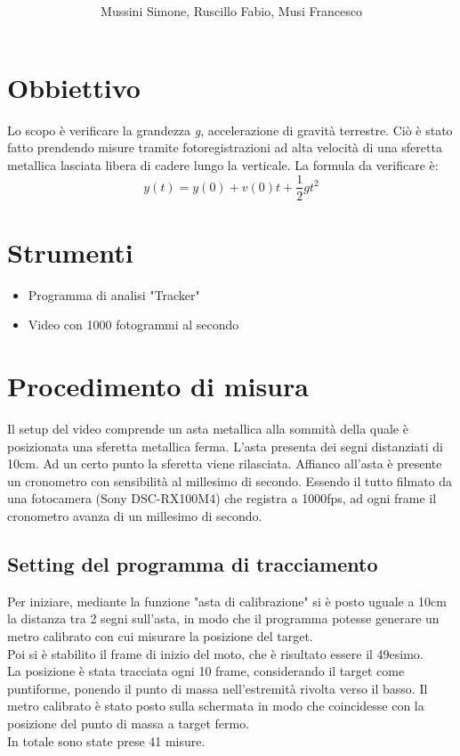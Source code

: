 \documentclass[12pt, a4paper]{article}
\title{\textbf{\scalebox{1.3}{\text{Moto di un grave lungo la verticale}}}}
\date{}
\author{\begin{small}Mussini Simone, Ruscillo Fabio, Musi Francesco\end{small}}
\begin{document}
\maketitle
\section{Obbiettivo}
Lo scopo è verificare la grandezza \textit{g}, accelerazione di gravità terrestre. 
Ciò è stato fatto prendendo misure tramite fotoregistrazioni ad alta velocità di una sferetta metallica lasciata libera di cadere lungo la verticale. 
La formula da verificare è:
\begin{equation*}
    y(t) = y(0) + v(0)t + \frac{1}{2}gt^2
\end{equation*}


\section{Strumenti}
\begin{itemize}
\setlength\itemsep{0mm}
    \item Programma di analisi "Tracker"
    \item Video con 1000 fotogrammi al secondo
\end{itemize}

\section{Procedimento di misura}
Il setup del video comprende un asta metallica alla sommità della quale è posizionata una sferetta metallica ferma. L'asta presenta dei segni distanziati di 10cm. 
Ad un certo punto la sferetta viene rilasciata. Affianco all'asta è presente un cronometro con sensibilità al millesimo di secondo. 
Essendo il tutto filmato da una fotocamera (Sony DSC-RX100M4) che registra a 1000fps, ad ogni frame il cronometro avanza di un millesimo di secondo.

  
\subsection{Setting del programma di tracciamento}
Per iniziare, mediante la funzione "asta di calibrazione" si è posto uguale a 10cm la distanza tra 2 segni sull'asta, in modo che il programma potesse generare un metro calibrato con cui misurare la posizione del target. \\
Poi si è stabilito il frame di inizio del moto, che è risultato essere il 49esimo.  \\
La posizione è stata tracciata ogni 10 frame, considerando il target come puntiforme, ponendo il punto di massa nell'estremità rivolta verso il basso. Il metro calibrato è stato posto sulla schermata in modo che coincidesse con la posizione del punto di massa a target fermo.\\
In totale sono state prese 41 misure.
\end{document}
